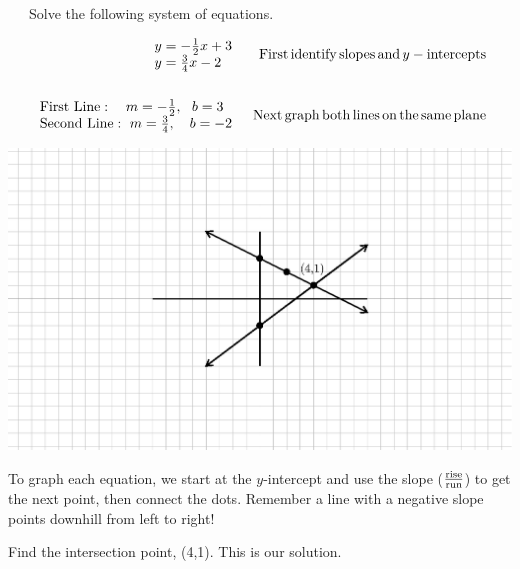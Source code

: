 \begin{example}~~~Solve the following system of equations.
  
  \begin{eqnarray*}
    \begin{array}{l}
      y = - \frac{1}{2} x + 3\\
    	y = \frac{3}{4} x - 2
   \end{array} &  & \operatorname{First} \operatorname{identify}
    \operatorname{slopes} \operatorname{and} y - \operatorname{intercepts}\\
  & & \\ 
	\begin{array}{l}
      \operatorname{First~Line} : ~~~m = - \frac{1}{2}, ~~b = 3\\
      \operatorname{Second~Line} : ~m = \frac{3}{4}, ~~~b = - 2
    \end{array} &  & \operatorname{Next} \operatorname{graph} \operatorname{both}
    \operatorname{lines} \operatorname{on} \operatorname{the} \operatorname{same} \operatorname{plane}\\
  \end{eqnarray*}
  
	
	\begin{multicols}{2}
    \includegraphics[scale=.85,bb = 115 65 310 190, clip=true]{II_2_1-1.eps}
    
    To graph each equation, we start at the $y$-intercept and use the slope
    ($\frac{\operatorname{rise}}{\operatorname{run}}$) to get the next point, then connect the
    dots.\pp
		Remember a line with a negative slope points downhill from left to right!
  \end{multicols}
    \begin{center}
    Find the intersection point, (4,1).  This is our solution.
		\end{center}
\end{example}


